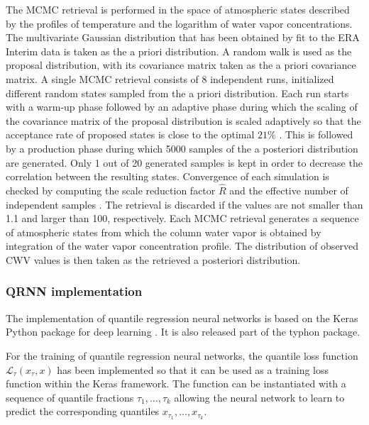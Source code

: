 \documentclass[journal abbreviation, manuscript]{copernicus}
\begin{document}
  The MCMC retrieval is performed in the space of atmospheric states described
  by the profiles of temperature and the logarithm of water vapor concentrations. The
  multivariate Gaussian distribution that has been obtained by fit to the ERA
  Interim data is taken as the a priori distribution. A random walk is used as
  the proposal distribution, with its covariance matrix taken as the a priori
  covariance matrix. A single MCMC retrieval consists of 8 independent runs,
  initialized  different random states sampled from the a priori
  distribution. Each run starts with a warm-up phase followed by an adaptive
  phase during which the scaling of the covariance matrix of the proposal
  distribution is scaled adaptively so that the acceptance rate of proposed states is
  close to the optimal $21\%$ \citep{bda}. This is followed by a production
  phase during which 5000 samples of the a posteriori distribution are
  generated. Only 1 out of 20 generated samples is kept in order to decrease the
  correlation between the resulting states. Convergence of each simulation is
  checked by computing the scale reduction factor $\hat{R}$ and the effective
  number of independent samples \citep[Eq. (11.12), (11.13)]{bda}. The
  retrieval is discarded if the values are not smaller than 1.1 and larger than
  100, respectively. Each MCMC retrieval generates a sequence of atmospheric
  states from which the column water vapor is obtained by integration of the
  water vapor concentration profile. The distribution of observed CWV values
  is then taken as the retrieved a posteriori distribution.

  
\subsubsection{QRNN implementation}
\label{sec:implementation_qrnn}

  The implementation of quantile regression neural networks is based on the
  Keras Python package for deep learning \citep{keras}. It is also released
  part of the typhon package.

  For the training of quantile regression neural networks, the quantile loss
  function $\mathcal{L}_\tau(x_\tau, x)$ has been implemented so that it can be
  used as a training loss function within the Keras framework. The function can
  be instantiated with a sequence of quantile fractions $\tau_1, \ldots,
  \tau_k$ allowing the neural network to learn to predict the corresponding
  quantiles $x_{\tau_1}, \ldots, x_{\tau_k}$.
\end{document}
